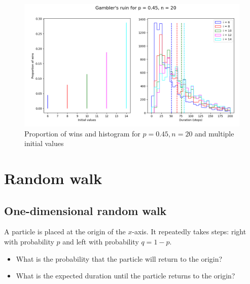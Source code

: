 \documentclass[11pt,a4paper]{article}
\begin{document}
\begin{figure}
\begin{center}
\includegraphics[width=\textwidth]{gamblers-ruin-02}
\caption{Proportion of wins and histogram for $p=0.45, n=20$ and multiple initial values}\label{f.gambler-hist2}
\end{center}
\end{figure}


\section{Random walk}\label{s.walk}

\subsection{One-dimensional random walk}

A particle is placed at the origin of the $x$-axis. It repeatedly takes steps: right with probability $p$ and left with probability $q=1-p$.
\begin{center}
\end{center}
\begin{itemize}
\item What is the probability that the particle will return to the origin?
\item What is the expected duration until the particle returns to the origin?
\end{itemize}
\end{document}
